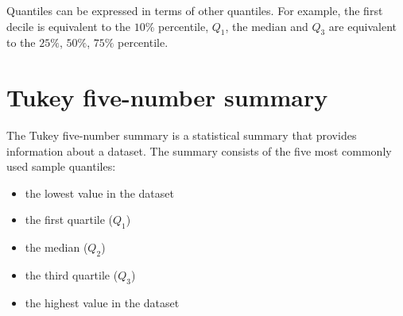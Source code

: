 \documentclass[a4paper,12pt]{article}
\begin{document}
	Quantiles can be expressed in terms of other quantiles. For example, the first decile is equivalent to the $10\%$ percentile, $Q_1$, the median and $Q_3$ are equivalent to the $25\%$, $50\%$, $75\%$ percentile.
	
\section*{Tukey five-number summary}
	The Tukey five-number summary is a statistical summary that provides information about a dataset.
	The summary consists of the five most commonly used sample quantiles:
	
	\begin{itemize}
		\item the lowest value in the dataset
		\item the first quartile ($Q_1$)
		\item the median ($Q_2$)
		\item the third quartile ($Q_3$)
		\item the highest value in the dataset
	\end{itemize}
	
\end{document}
